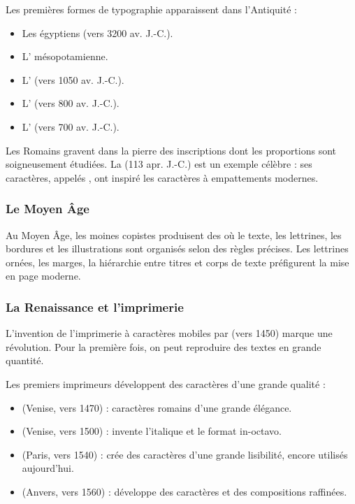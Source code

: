 Les premières formes de typographie apparaissent dans l'Antiquité :

\begin{itemize}
    \item Les  égyptiens (vers 3200 av. J.-C.).
    \item L' mésopotamienne.
    \item L' (vers 1050 av. J.-C.).
    \item L' (vers 800 av. J.-C.).
    \item L' (vers 700 av. J.-C.).
\end{itemize}

Les Romains gravent dans la pierre des inscriptions dont les proportions sont soigneusement étudiées. La  (113 apr. J.-C.) est un exemple célèbre : ses caractères, appelés , ont inspiré les caractères à empattements modernes.

\subsubsection{Le Moyen Âge}

Au Moyen Âge, les moines copistes produisent des  où le texte, les lettrines, les bordures et les illustrations sont organisés selon des règles précises. Les lettrines ornées, les marges, la hiérarchie entre titres et corps de texte préfigurent la mise en page moderne.

\subsubsection{La Renaissance et l'imprimerie}

L'invention de l'imprimerie à caractères mobiles par  (vers 1450) marque une révolution. Pour la première fois, on peut reproduire des textes en grande quantité.

Les premiers imprimeurs développent des caractères d'une grande qualité :

\begin{itemize}
    \item {} (Venise, vers 1470) : caractères romains d'une grande élégance.
    \item {} (Venise, vers 1500) : invente l'italique et le format in-octavo.
    \item {} (Paris, vers 1540) : crée des caractères d'une grande lisibilité, encore utilisés aujourd'hui.
    \item {} (Anvers, vers 1560) : développe des caractères et des compositions raffinées.
\end{itemize}

